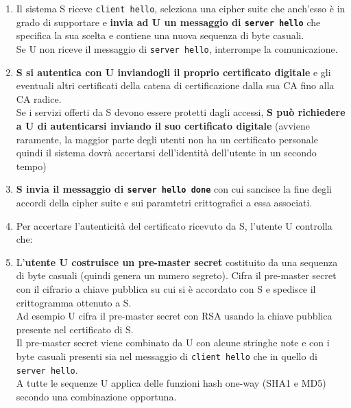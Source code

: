 \documentclass[10pt]{book}
\begin{document}
\begin{list}{}{}
\begin{enumerate}
		\item Il sistema S riceve \texttt{client hello}, seleziona una cipher suite che anch'esso è in grado di supportare e \textbf{invia ad U un messaggio di \texttt{server hello}} che specifica la sua scelta e contiene una nuova sequenza di byte casuali.\\
		Se U non riceve il messaggio di \texttt{server hello}, interrompe la comunicazione.
		\item \textbf{S si autentica con U inviandogli il proprio certificato digitale} e gli eventuali altri certificati della catena di certificazione dalla sua CA fino alla CA radice.\\
		Se i servizi offerti da S devono essere protetti dagli accessi, \textbf{S può richiedere a U di autenticarsi inviando il suo certificato digitale} (avviene raramente, la maggior parte degli utenti non ha un certificato personale quindi il sistema dovrà accertarsi dell'identità dell'utente in un secondo tempo)
		\item \textbf{S invia il messaggio di \texttt{server hello done}} con cui sancisce la fine degli accordi della cipher suite e sui paramtetri crittografici a essa associati.
		\item Per accertare l'autenticità del certificato ricevuto da S, l'utente U controlla che:
		\item L'\textbf{utente U costruisce un pre-master secret} costituito da una sequenza di byte casuali (quindi genera un numero segreto). Cifra il pre-master secret con il cifrario a chiave pubblica su cui si è accordato con S e spedisce il crittogramma ottenuto a S.\\
		Ad esempio U cifra il pre-master secret con RSA usando la chiave pubblica presente nel certificato di S.\\
		Il pre-master secret viene combinato da U con alcune stringhe note e con i byte casuali presenti sia nel messaggio di \texttt{client hello} che in quello di \texttt{server hello}.\\
		A tutte le sequenze U applica delle funzioni hash one-way (SHA1 e MD5) secondo una combinazione opportuna.\\

\end{enumerate}
\end{list}
\end{document}
